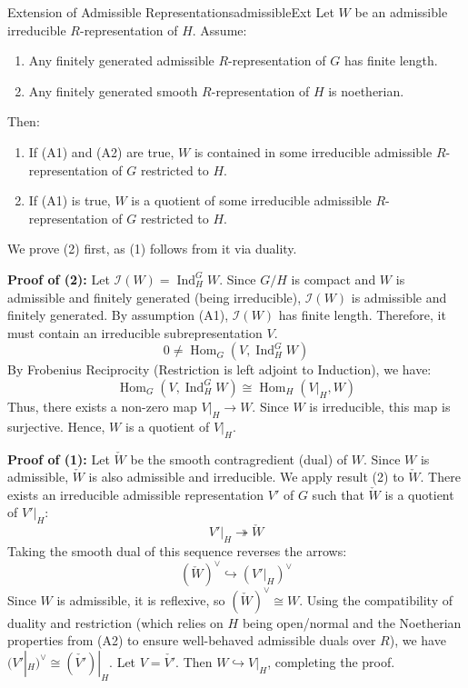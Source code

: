\documentclass{article}
\begin{document}
\begin{prop}{Extension of Admissible Representations}{admissibleExt}
   Let $W$ be an admissible irreducible $R$-representation of $H$. Assume:
  \begin{enumerate}[label=(A\arabic*)]
      \item Any finitely generated admissible $R$-representation of $G$ has finite length.
      \item Any finitely generated smooth $R$-representation of $H$ is noetherian.
  \end{enumerate}

  Then:
  \begin{enumerate}[label=(\arabic*)]
      \item If (A1) and (A2) are true, $W$ is contained in some irreducible admissible $R$-representation of $G$ restricted to $H$.
      \item If (A1) is true, $W$ is a quotient of some irreducible admissible $R$-representation of $G$ restricted to $H$.
  \end{enumerate}
\end{prop}

\begin{Proof}
  We prove (2) first, as (1) follows from it via duality.

  \textbf{Proof of (2):}
  Let $\mathcal{I}(W) = \operatorname{Ind}_H^G W$. Since $G/H$ is compact and $W$ is admissible and finitely generated (being irreducible), $\mathcal{I}(W)$ is admissible and finitely generated.
  By assumption (A1), $\mathcal{I}(W)$ has finite length. Therefore, it must contain an irreducible subrepresentation $V$.
  \[ 0 \neq \operatorname{Hom}_G(V, \operatorname{Ind}_H^G W) \]
  By Frobenius Reciprocity (Restriction is left adjoint to Induction), we have:
  \[ \operatorname{Hom}_G(V, \operatorname{Ind}_H^G W) \cong \operatorname{Hom}_H(V|_H, W) \]
  Thus, there exists a non-zero map $V|_H \to W$. Since $W$ is irreducible, this map is surjective. Hence, $W$ is a quotient of $V|_H$.

  \textbf{Proof of (1):}
  Let $\check{W}$ be the smooth contragredient (dual) of $W$. Since $W$ is admissible, $\check{W}$ is also admissible and irreducible.
  We apply result (2) to $\check{W}$. There exists an irreducible admissible representation $V'$ of $G$ such that $\check{W}$ is a quotient of $V'|_H$:
  \[ V'|_H \twoheadrightarrow \check{W} \]
  Taking the smooth dual of this sequence reverses the arrows:
  \[ (\check{W})^\vee \hookrightarrow (V'|_H)^\vee \]
  Since $W$ is admissible, it is reflexive, so $(\check{W})^\vee \cong W$.
  Using the compatibility of duality and restriction (which relies on $H$ being open/normal and the Noetherian properties from (A2) to ensure well-behaved admissible duals over $R$), we have $(V'|_H)^\vee \cong (\check{V'})|_H$.
  Let $V = \check{V'}$. Then $W \hookrightarrow V|_H$, completing the proof.
\end{Proof}
\end{document}
